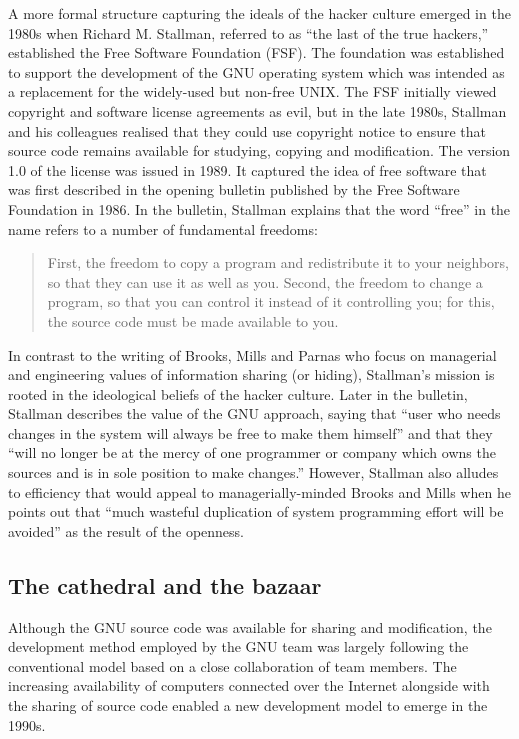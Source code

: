 A more formal structure capturing the ideals of the hacker culture emerged in the 1980s
when Richard M. Stallman, referred to as ``the last of the true
hackers,'' established the Free Software Foundation (FSF). The foundation
was established to support the development of the GNU operating system which was intended
as a replacement for the widely-used but non-free UNIX.
The FSF initially viewed copyright and software license agreements as evil, but in the
late 1980s, Stallman and his colleagues realised that they could use copyright notice to
ensure that source code remains available for studying, copying and modification.
The version 1.0 of the license was issued in 1989. It captured the idea of free software that
was first described in the opening bulletin published by the Free Software Foundation in
1986. In the bulletin, Stallman explains that the word ``free'' in the name refers to a number
of fundamental freedoms:

\begin{quote}
First, the freedom to copy a program and redistribute it to
your neighbors, so that they can use it as well as you.  Second, the
freedom to change a program, so that you can control it instead of it
controlling you; for this, the source code must be made available to you.
\end{quote}

In contrast to the writing of Brooks, Mills and Parnas who focus on managerial and engineering
values of information sharing (or hiding), Stallman's mission is rooted in the ideological
beliefs of the hacker culture. Later in the bulletin, Stallman
describes the value of the GNU approach, saying that ``user
who needs changes in the system will always be free to make them himself'' and that they ``will
no longer be at the mercy of one programmer or company which owns the sources and is in sole
position to make changes.'' However, Stallman also alludes to efficiency that would appeal to
managerially-minded Brooks and Mills when he points out that ``much wasteful duplication of
system programming effort will be avoided'' as the result of the openness.

\subsection{The cathedral and the bazaar}
Although the GNU source code was available for sharing and modification, the development
method employed by the GNU team was largely following the conventional
model based on a close collaboration of team members.
The increasing availability of computers connected over the Internet alongside with
the sharing of source code enabled a new development model to emerge in the 1990s.

